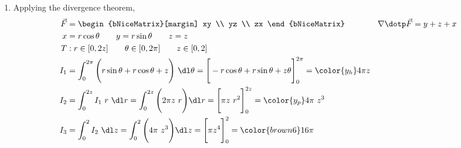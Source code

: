 \begin{enumerate}
     \item Applying the divergence theorem,
           \begin{align}
                \vec{F} & = \begin{bNiceMatrix}[margin]
                                 xy \\ yz \\ zx
                            \end{bNiceMatrix} \qquad\qquad
                \nabla \dotp \vec{F} = y + z + x                              \\
                x       & = r\cos \theta \qquad y = r\sin \theta
                \qquad z = z                                                  \\
                T       & : r \in [0, 2z] \qquad \theta \in [0, 2\pi] \qquad
                z \in [0, 2]                                                  \\
                I_1     & = \int_{0}^{2\pi} \Bigg(r\sin \theta + r\cos \theta
                + z\Bigg)
                \ \dl \theta
                = \Bigg[ -r\cos \theta + r\sin \theta + z \theta \Bigg]_{0}^{2\pi}
                = {\color{y_h} 4\pi z}                                        \\
                I_2     & = \int_{0}^{2z} I_1 \ r\ \dl r
                = \int_{0}^{2z} \Bigg( 2\pi z\ r \Bigg) \dl r
                = \Bigg[ \pi z\ r^2 \Bigg]_{0}^{2z}
                = {\color{y_p} 4\pi\ z^3 }                                    \\
                I_3     & = \int_{0}^{2} I_2\ \dl z = \int_{0}^{2}
                \Bigg( 4\pi\ z^3 \Bigg) \dl z
                = \Bigg[ \pi z^4 \Bigg]_{0}^{2}
                = {\color{brown6} 16\pi}
           \end{align}


\end{enumerate}
